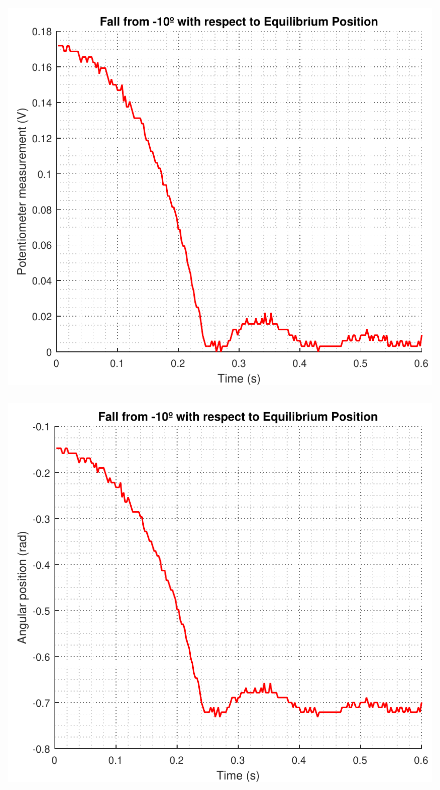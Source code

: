 \begin{minipage}{\linewidth}
	\begin{minipage}{0.45\linewidth}
		\begin{figure}[H]
			\includegraphics[scale=.53]{figures/aTestFallResponse2}
			\centering
			\vspace{-.4cm}
			\captionsetup{justification=centering}
			\label{graphFallResponsVolt}
		\end{figure}\vspace{-5mm}
	\end{minipage}
	\hspace{0.03\linewidth}
	\begin{minipage}{0.45\linewidth}
		\begin{figure}[H]
			\includegraphics[scale=.53]{figures/aTestFallResponse1}

\end{figure}
\end{minipage}
\end{minipage}
